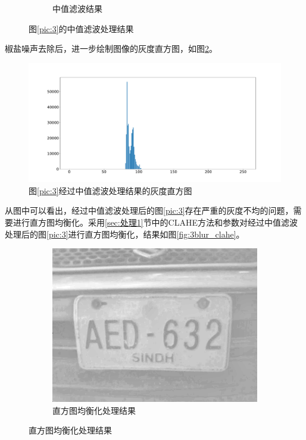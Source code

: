 \documentclass[a4paper]{ctexart}
\newcommand{\outwtwo}{0.4\textwidth}
\begin{document}
\begin{spacing}{1.35}
\begin{figure}[htbp]
\begin{subfigure}[t]{\outwtwo}
			\caption{中值滤波结果}
		\end{subfigure}
		\caption{图\ref{pic:3}的中值滤波处理结果}
		\label{fig:3blur}
	\end{figure}
	椒盐噪声去除后，进一步绘制图像的灰度直方图，如图\ref{fig:3blur_hist}。
	\begin{figure}[htbp]
		\centering
		\includegraphics[width=\textwidth]{figure/3_img_blur_hist.pdf}
		\caption{图\ref{pic:3}经过中值滤波处理结果的灰度直方图}
		\label{fig:3blur_hist}
	\end{figure}
	从图中可以看出，经过中值滤波处理后的图\ref{pic:3}存在严重的灰度不均的问题，需要进行直方图均衡化。采用\ref{sec:处理1}节中的CLAHE方法和参数对经过中值滤波处理后的图\ref{pic:3}进行直方图均衡化，结果如图\ref{fig:3blur_clahe}。
	\begin{figure}[htbp]
		\centering
		\begin{subfigure}[t]{\outwtwo}
			\centering
			\includegraphics[width=1.05\textwidth]{figure/3_img_clahe_1.png}
			\caption{直方图均衡化处理结果}
		\end{subfigure}

\end{figure}
\end{spacing}
\end{document}
